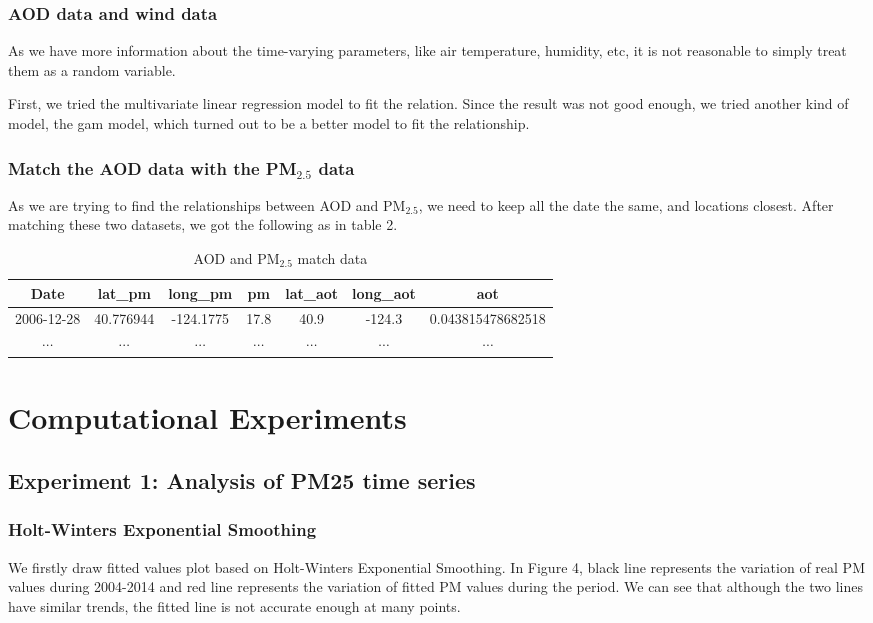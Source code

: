 \documentclass[10pt]{article}
\begin{document}
\subsubsection{AOD data and wind data}
As we have more information about the time-varying parameters, like air temperature, humidity, etc, it is not reasonable to simply treat them as a random variable. 

First, we tried the multivariate linear regression model to fit the relation. Since the result was not good enough, we tried another kind of model, the gam model, which turned out to be a better model to fit the relationship.

\subsubsection{Match the AOD data with the PM$_{2.5}$ data}
As we are trying to find the relationships between AOD and PM$_{2.5}$, we need to keep all the date the same, and locations closest. After matching these two datasets, we got the following as in table 2.

\begin{table}[H]
\centering
\begin{tabular}{|c|c|c|c|c|c|c|}
\hline 
Date & lat\_pm & long\_pm & pm & lat\_aot & long\_aot & aot\\
\hline
2006-12-28 & 40.776944 & -124.1775 & 17.8 & 40.9 & -124.3 & 0.043815478682518\\
\hline
$\cdots$ & $\cdots$ & $\cdots$ & $\cdots$ & $\cdots$ & $\cdots$ & $\cdots$\\
\hline
\end{tabular}
\caption{AOD and PM$_{2.5}$ match data}
\end{table}





\section{Computational Experiments}

\subsection{Experiment 1: Analysis of PM25 time series}

\subsubsection{Holt-Winters Exponential Smoothing}
We firstly draw fitted values plot based on Holt-Winters Exponential Smoothing. In Figure 4, black line represents the variation of real PM values during 2004-2014 and red line represents the variation of fitted PM values during the period. We can see that although the two lines have similar trends, the fitted line is not accurate enough at many points.
\end{document}
